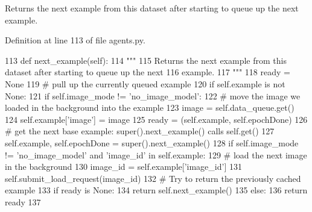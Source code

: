 \begin{DoxyVerb}Returns the next example from this dataset after starting to queue up the next
example.
\end{DoxyVerb}
 

Definition at line 113 of file agents.\+py.


\begin{DoxyCode}
113     \textcolor{keyword}{def }next\_example(self):
114         \textcolor{stringliteral}{"""}
115 \textcolor{stringliteral}{        Returns the next example from this dataset after starting to queue up the next}
116 \textcolor{stringliteral}{        example.}
117 \textcolor{stringliteral}{        """}
118         ready = \textcolor{keywordtype}{None}
119         \textcolor{comment}{# pull up the currently queued example}
120         \textcolor{keywordflow}{if} self.example \textcolor{keywordflow}{is} \textcolor{keywordflow}{not} \textcolor{keywordtype}{None}:
121             \textcolor{keywordflow}{if} self.image\_mode != \textcolor{stringliteral}{'no\_image\_model'}:
122                 \textcolor{comment}{# move the image we loaded in the background into the example}
123                 image = self.data\_queue.get()
124                 self.example[\textcolor{stringliteral}{'image'}] = image
125             ready = (self.example, self.epochDone)
126         \textcolor{comment}{# get the next base example: super().next\_example() calls self.get()}
127         self.example, self.epochDone = super().next\_example()
128         \textcolor{keywordflow}{if} self.image\_mode != \textcolor{stringliteral}{'no\_image\_model'} \textcolor{keywordflow}{and} \textcolor{stringliteral}{'image\_id'} \textcolor{keywordflow}{in} self.example:
129             \textcolor{comment}{# load the next image in the background}
130             image\_id = self.example[\textcolor{stringliteral}{'image\_id'}]
131             self.submit\_load\_request(image\_id)
132         \textcolor{comment}{# Try to return the previously cached example}
133         \textcolor{keywordflow}{if} ready \textcolor{keywordflow}{is} \textcolor{keywordtype}{None}:
134             \textcolor{keywordflow}{return} self.next\_example()
135         \textcolor{keywordflow}{else}:
136             \textcolor{keywordflow}{return} ready
137 
\end{DoxyCode}
\mbox{\label{classparlai_1_1tasks_1_1vqa__v2_1_1agents_1_1OeTeacher_a98b9f8bc131ddb23d185811a479dc742}} 
